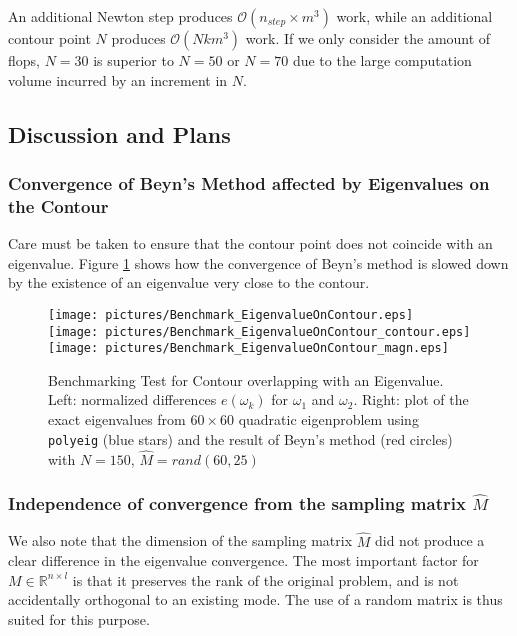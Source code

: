 \documentclass[final,leqno,onefignum,onetabnum]{siamltex1213}
\begin{document}
An additional Newton step produces $\mathcal{O}(n_{step}\times m^3 )$ work, while an additional contour point $N$ produces $\mathcal{O}(Nk m^3)$ work. If we only consider the amount of flops, $N=30$ is superior to $N=50$ or $N=70$ due to the large computation volume incurred by an increment in $N$. 

\pagebreak
\subsection{Discussion and Plans}

\subsubsection{Convergence of Beyn's Method affected by Eigenvalues on the Contour}
Care must be taken to ensure that the contour point does not coincide with an eigenvalue. Figure \ref{fig:overlap} shows how the convergence of Beyn's method is slowed down by the existence of an eigenvalue very close to the contour.
\begin{figure}\label{fig:overlap}
\begin{center}
\texttt{[image: pictures/Benchmark\_EigenvalueOnContour.eps]}\\
\texttt{[image: pictures/Benchmark\_EigenvalueOnContour\_contour.eps]}
\texttt{[image: pictures/Benchmark\_EigenvalueOnContour\_magn.eps]}
\end{center}
\caption{Benchmarking Test for Contour overlapping with an Eigenvalue. \textnormal{Left: normalized differences $e(\omega_k)$ for $\omega_1$ and $\omega_2$. Right: plot of the exact eigenvalues from $60 \times 60$ quadratic eigenproblem using {\tt polyeig} (blue stars) and the result of Beyn's method (red circles) with $N=150$, $\hat{M}=rand(60,25)$}}
\end{figure}

\subsubsection{Independence of convergence from the sampling matrix $\hat{M}$}
We also note that the dimension of the sampling matrix $\hat{M}$ did not produce a clear difference in the eigenvalue convergence. The most important factor for $M\in \mathbb{R}^{n\times l}$ is that it preserves the rank of the original problem, and is not accidentally orthogonal to an existing mode. The use of a random matrix is thus suited for this purpose.
\end{document}
